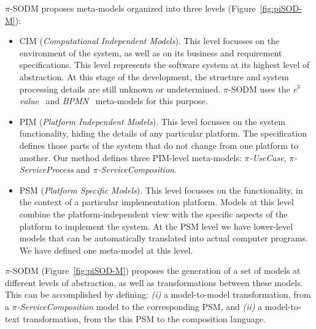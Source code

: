 $\pi$-SODM proposes meta-models organized into three levels (Figure~\ref{fig:piSOD-M}): 
\begin{itemize}
\item CIM (\textit{Computational Independent Models}). This level focusses on the
environment of the system, as well as on its business and requirement specifications.
This level represents the software system at its highest level of abstraction.
At this stage of the development, the structure and system processing details are still unknown or undetermined.  
$\pi$-SODM uses the \textit{e$^3$value}~\cite{e3value} and \textit{BPMN}~\cite{BPMN} meta-models for this purpose. 

\item PIM (\textit{Platform Independent Models}). This level focusses on the system functionality, hiding the details of any particular platform.
The specification defines those parts of the system that do not change from one platform to another. 
Our method defines three PIM-level meta-models: \textit{$\pi$-UseCase}, \textit{$\pi$-ServiceProcess} and \textit{$\pi$-ServiceComposition}.
 
 \item PSM (\textit{Platform Specific Models}). This level focusses on the functionality, in the context of a particular implementation platform.
Models at this level combine the platform-independent view with the specific aspects of the platform to implement the system. At the PSM level we have lower-level models that can be automatically translated into actual computer programs. 
We have defined one meta-model at this level.
\end{itemize}


$\pi$-SODM (Figure~\ref{fig:piSOD-M}) proposes the generation of a set of models at different levels of abstraction, as well as transformations between these models.
This can be accomplished by defining: \textit{(i)} a model-to-model transformation, from a \textit{$\pi$-ServiceComposition} model to the corresponding PSM, and \textit{(ii)} a model-to-text transformation, from the this PSM to the composition language.

